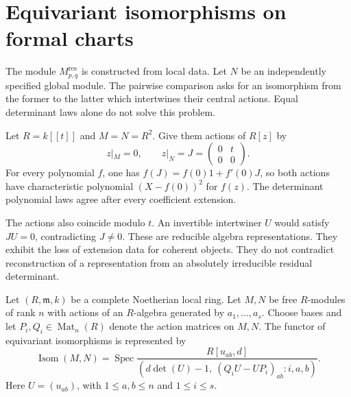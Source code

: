 \section{Equivariant isomorphisms on formal charts}
\label{v4-arith:ic:bcglue-core:core-theorem}

The module $M_{p,q}^{\mathrm{res}}$ is constructed from local data.
Let $N$ be an independently specified global module.
The pairwise comparison asks for an isomorphism from the former
to the latter which intertwines their central actions.
Equal determinant laws alone do not solve this problem.

\begin{example}
\label{v4-arith:ic:bcglue-core:ex:extension-data}
Let $R=k[[t]]$ and $M=N=R^2$. Give them actions of $R[z]$ by
\[
 z|_M=0,\qquad z|_N=J=\begin{pmatrix}0&t\\0&0\end{pmatrix}.
\]
For every polynomial $f$, one has
$f(J)=f(0)1+f'(0)J$, so both actions have characteristic
polynomial $(X-f(0))^2$ for $f(z)$.
The determinant polynomial laws agree after every coefficient
extension.

The actions also coincide modulo $t$.
An invertible intertwiner $U$ would satisfy $JU=0$, contradicting
$J\ne0$. These are reducible algebra representations.
They exhibit the loss of extension data for coherent objects.
They do not contradict reconstruction of a representation from an
absolutely irreducible residual determinant.
\end{example}

\begin{proposition}
\label{v4-arith:ic:bcglue-core:thm:pairwise-reduces-to-chenevier}
Let $(R,\mathfrak m,k)$ be a complete Noetherian local ring.
Let $M,N$ be free $R$-modules of rank $n$ with actions of an
$R$-algebra generated by $a_1,\ldots,a_s$.
Choose bases and let $P_i,Q_i\in\operatorname{Mat}_n(R)$ denote
the action matrices on $M,N$.
The functor of equivariant isomorphisms is represented by
\begin{equation}
\label{v4-arith:ic:bcglue-core:eq:pairwise-chenevier-equivalent}
 \operatorname{Isom}(M,N)
 =\operatorname{Spec}
 \frac{R[u_{ab},d]}{
 (d\det(U)-1,\ (Q_iU-UP_i)_{ab}:i,a,b)}.
\end{equation}
Here $U=(u_{ab})$, with $1\le a,b\le n$ and $1\le i\le s$.
\end{proposition}

